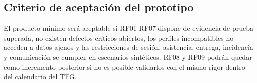 \subsection{Criterio de aceptación del prototipo}\label{sec:4-5-1}

El producto mínimo será aceptable si RF01-RF07 dispone de evidencia de prueba superada, no existen defectos críticos abiertos, los perfiles incompatibles no acceden a datos ajenos y las restricciones de sesión, asistencia, entrega, incidencia y comunicación se cumplen en escenarios sintéticos. RF08 y RF09 podrán quedar como incremento posterior si no es posible validarlos con el mismo rigor dentro del calendario del TFG.

